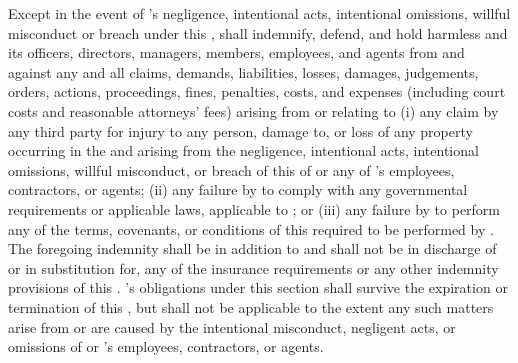 Except in the event of \lessee's negligence, intentional acts, intentional omissions, willful misconduct or breach under this \lease, \lessor shall indemnify, defend, and hold harmless \lessee and its officers, directors, managers, members, employees, and agents from and against any and all claims, demands, liabilities, losses, damages, judgements, orders, actions, proceedings, fines, penalties, costs, and expenses (including court costs and reasonable attorneys' fees) arising from or relating to (i) any claim by any third party for injury to any person, damage to, or loss of any property occurring in the \building and arising from the negligence, intentional acts,  intentional omissions, willful misconduct, or breach of this \lease of \lessor or any of \lessor's employees, contractors, or agents; (ii) any failure by \lessor to comply with any governmental requirements or applicable laws, applicable to \lessor; or (iii) any failure by \lessor to perform any of the terms, covenants, or conditions of this \lease required to be performed by \lessor. The foregoing indemnity shall be in addition to and shall not be in discharge of or in substitution for, any of the insurance requirements or any other indemnity provisions of this \lease. \lessor's obligations under this section shall survive the expiration or termination of this \lease, but shall not be applicable to the extent any such matters arise from or are caused by the intentional misconduct, negligent acts, or omissions of \lessee or \lessee's employees, contractors, or agents.
